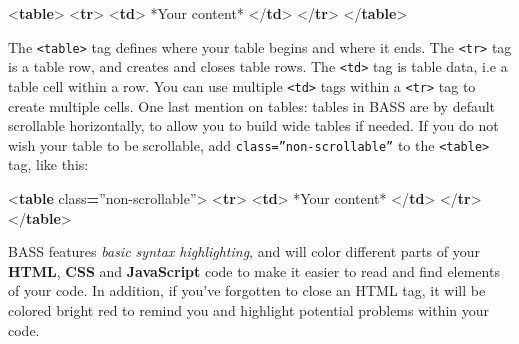 \documentclass[
]{book}
\newenvironment{Shaded}{\begin{snugshade}}{\end{snugshade}}
\newcommand{\DataTypeTok}[1]{\textcolor[rgb]{0.13,0.29,0.53}{#1}}
\newcommand{\KeywordTok}[1]{\textcolor[rgb]{0.13,0.29,0.53}{\textbf{#1}}}
\newcommand{\NormalTok}[1]{#1}
\newcommand{\OperatorTok}[1]{\textcolor[rgb]{0.81,0.36,0.00}{\textbf{#1}}}
\newcommand{\OtherTok}[1]{\textcolor[rgb]{0.56,0.35,0.01}{#1}}
\newcommand{\StringTok}[1]{\textcolor[rgb]{0.31,0.60,0.02}{#1}}
\begin{document}
\begin{Shaded}
\begin{Highlighting}[]
\DataTypeTok{\textless{}}\KeywordTok{table}\DataTypeTok{\textgreater{}}
  \DataTypeTok{\textless{}}\KeywordTok{tr}\DataTypeTok{\textgreater{}}
    \DataTypeTok{\textless{}}\KeywordTok{td}\DataTypeTok{\textgreater{}}
\NormalTok{      *Your content*}
    \DataTypeTok{\textless{}/}\KeywordTok{td}\DataTypeTok{\textgreater{}}
  \DataTypeTok{\textless{}/}\KeywordTok{tr}\DataTypeTok{\textgreater{}}
\DataTypeTok{\textless{}/}\KeywordTok{table}\DataTypeTok{\textgreater{}}
\end{Highlighting}
\end{Shaded}

The \texttt{\textless{}table\textgreater{}} tag defines where your table begins and where it ends. The \texttt{\textless{}tr\textgreater{}} tag is a table row, and creates and closes table rows. The \texttt{\textless{}td\textgreater{}} tag is table data, i.e a table cell within a row. You can use multiple \texttt{\textless{}td\textgreater{}} tags within a \texttt{\textless{}tr\textgreater{}} tag to create multiple cells.
One last mention on tables: tables in BASS are by default scrollable horizontally, to allow you to build wide tables if needed. If you do not wish your table to be scrollable, add \texttt{class=”non-scrollable”} to the \texttt{\textless{}table\textgreater{}} tag, like this:

\begin{Shaded}
\begin{Highlighting}[]
\DataTypeTok{\textless{}}\KeywordTok{table}\OtherTok{ class}\OperatorTok{=}\StringTok{”non{-}scrollable”}\DataTypeTok{\textgreater{}}
  \DataTypeTok{\textless{}}\KeywordTok{tr}\DataTypeTok{\textgreater{}}
    \DataTypeTok{\textless{}}\KeywordTok{td}\DataTypeTok{\textgreater{}}
\NormalTok{      *Your content*}
    \DataTypeTok{\textless{}/}\KeywordTok{td}\DataTypeTok{\textgreater{}}
  \DataTypeTok{\textless{}/}\KeywordTok{tr}\DataTypeTok{\textgreater{}}
\DataTypeTok{\textless{}/}\KeywordTok{table}\DataTypeTok{\textgreater{}}
\end{Highlighting}
\end{Shaded}

BASS features \emph{basic syntax highlighting}, and will color different parts of your \textbf{HTML}, \textbf{CSS} and \textbf{JavaScript} code to make it easier to read and find elements of your code. In addition, if you've forgotten to close an HTML tag, it will be colored bright red to remind you and highlight potential problems within your code.
\end{document}
